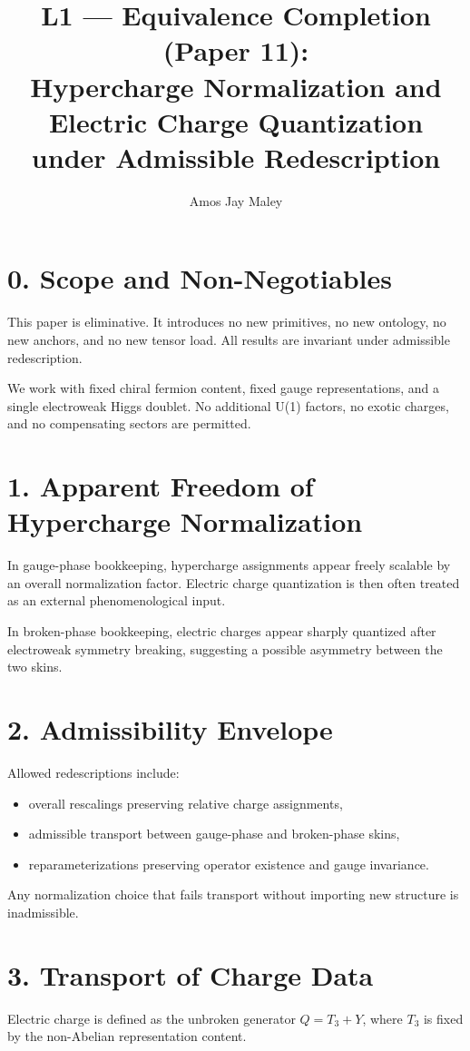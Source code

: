 ﻿\documentclass[11pt]{article}
\title{L1 --- Equivalence Completion (Paper 11):\\
Hypercharge Normalization and Electric Charge Quantization\\
under Admissible Redescription}
\author{Amos Jay Maley}
\date{}
\begin{document}
\maketitle

\section*{0. Scope and Non-Negotiables}
This paper is eliminative. It introduces no new primitives, no new ontology,
no new anchors, and no new tensor load.
All results are invariant under admissible redescription.

We work with fixed chiral fermion content,
fixed gauge representations,
and a single electroweak Higgs doublet.
No additional U(1) factors, no exotic charges,
and no compensating sectors are permitted.

\section*{1. Apparent Freedom of Hypercharge Normalization}
In gauge-phase bookkeeping,
hypercharge assignments appear freely scalable
by an overall normalization factor.
Electric charge quantization is then often treated
as an external phenomenological input.

In broken-phase bookkeeping,
electric charges appear sharply quantized
after electroweak symmetry breaking,
suggesting a possible asymmetry between the two skins.

\section*{2. Admissibility Envelope}
Allowed redescriptions include:
\begin{itemize}
\item overall rescalings preserving relative charge assignments,
\item admissible transport between gauge-phase and broken-phase skins,
\item reparameterizations preserving operator existence and gauge invariance.
\end{itemize}

Any normalization choice that fails transport
without importing new structure is inadmissible.

\section*{3. Transport of Charge Data}
Electric charge is defined as the unbroken generator
$Q = T_3 + Y$,
where $T_3$ is fixed by the non-Abelian representation content.
\end{document}
